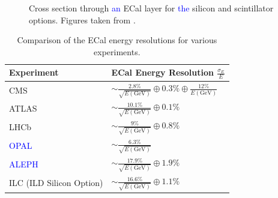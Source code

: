\begin{figure}[h!]
\centering
{} 
\hspace{1cm}
\caption[Cross section through \textcolor{blue}{an} ECal layer for \textcolor{blue}{the} \protect{} silicon and \protect{} scintillator options.  Figures taken from  \cite{Behnke:2013lya}.]{Cross section through \textcolor{blue}{an} ECal layer for \textcolor{blue}{the} \protect{} silicon and \protect{} scintillator options.  Figures taken from  \cite{Behnke:2013lya}.}
\label{fig:ecalimage}
\end{figure} 

\begin{table}[h!]
\centering
\begin{tabular}{ l l }
\hline
Experiment & ECal Energy Resolution $\frac{\sigma_{E}}{E}$ \\
\hline
CMS \cite{Chatrchyan:2013dga} & $\sim \frac{2.8\%}{\sqrt{E(\text{GeV})}} \oplus 0.3\% \oplus \frac{12\%}{E(\text{GeV})}$ \\
ATLAS \cite{Aharrouche:2006nf} & $\sim \frac{10.1\%}{\sqrt{E(\text{GeV})}} \oplus 0.1\%$ \\
LHCb \cite{Perret:2014owa} & $\sim \frac{9\%}{\sqrt{E(\text{GeV})}} \oplus 0.8\%$ \\
\textcolor{blue}{OPAL} \cite{Ahmet:1990eg} & $\sim \frac{6.3\%}{\sqrt{E(\text{GeV})}}$ \\
\textcolor{blue}{ALEPH} \cite{Buskulic:1994wz} & $\sim \frac{17.9\%}{\sqrt{E(\text{GeV})}} \oplus 1.9\%$ \\
ILC (ILD Silicon Option) \cite{Behnke:2013lya} & $\sim \frac{16.6\%}{\sqrt{E(\text{GeV})}} \oplus 1.1\%$ \\
\hline
\end{tabular}
\caption[Comparison of the ECal energy resolutions for various experiments.]{Comparison of the ECal energy resolutions for various experiments.}
\label{table:ecalenergyres}
\end{table}

